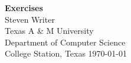 \documentclass{article}
\begin{document}
\begin{titlepage} \centering
\vspace*{5cm}
\textbf{\Huge Exercises}\\[1.5cm]
\Large Steven Writer\\
Texas A \& M University\\
Department of Computer Science\\[5mm]
College Station, Texas \today
\end{titlepage}
\end{document}
